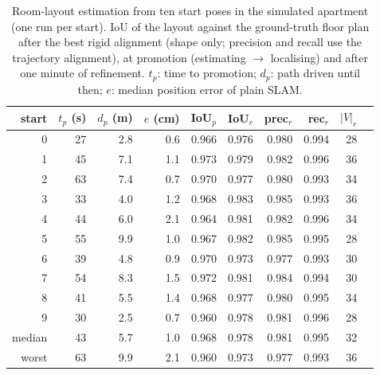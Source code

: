 \begin{table}[t]
\centering
\caption{Room-layout estimation from ten start poses in the simulated apartment (one run per start). IoU of the layout against the ground-truth floor plan after the best rigid alignment (shape only; precision and recall use the trajectory alignment), at promotion (estimating $\to$ localising) and after one minute of refinement. $t_p$: time to promotion; $d_p$: path driven until then; $e$: median position error of plain SLAM.}
\label{tab:estimation-campaign-bbcff1e}
\begin{tabular}{r r r r r r r r r r}
\toprule
start & $t_p$ (s) & $d_p$ (m) & $e$ (cm) & IoU$_p$ & IoU$_r$ & prec$_r$ & rec$_r$ & $|V|_r$ \\
\midrule
0 & 27 & 2.8 & 0.6 & 0.966 & 0.976 & 0.980 & 0.994 & 28 \\
1 & 45 & 7.1 & 1.1 & 0.973 & 0.979 & 0.982 & 0.996 & 36 \\
2 & 63 & 7.4 & 0.7 & 0.970 & 0.977 & 0.980 & 0.993 & 34 \\
3 & 33 & 4.0 & 1.2 & 0.968 & 0.983 & 0.985 & 0.993 & 36 \\
4 & 44 & 6.0 & 2.1 & 0.964 & 0.981 & 0.982 & 0.996 & 34 \\
5 & 55 & 9.9 & 1.0 & 0.967 & 0.982 & 0.985 & 0.995 & 28 \\
6 & 39 & 4.8 & 0.9 & 0.970 & 0.973 & 0.977 & 0.993 & 30 \\
7 & 54 & 8.3 & 1.5 & 0.972 & 0.981 & 0.984 & 0.994 & 30 \\
8 & 41 & 5.5 & 1.4 & 0.968 & 0.977 & 0.980 & 0.995 & 34 \\
9 & 30 & 2.5 & 0.7 & 0.960 & 0.978 & 0.981 & 0.996 & 28 \\
\midrule
median & 43 & 5.7 & 1.0 & 0.968 & 0.978 & 0.981 & 0.995 & 32 \\
worst & 63 & 9.9 & 2.1 & 0.960 & 0.973 & 0.977 & 0.993 & 36 \\
\bottomrule
\end{tabular}
\end{table}
